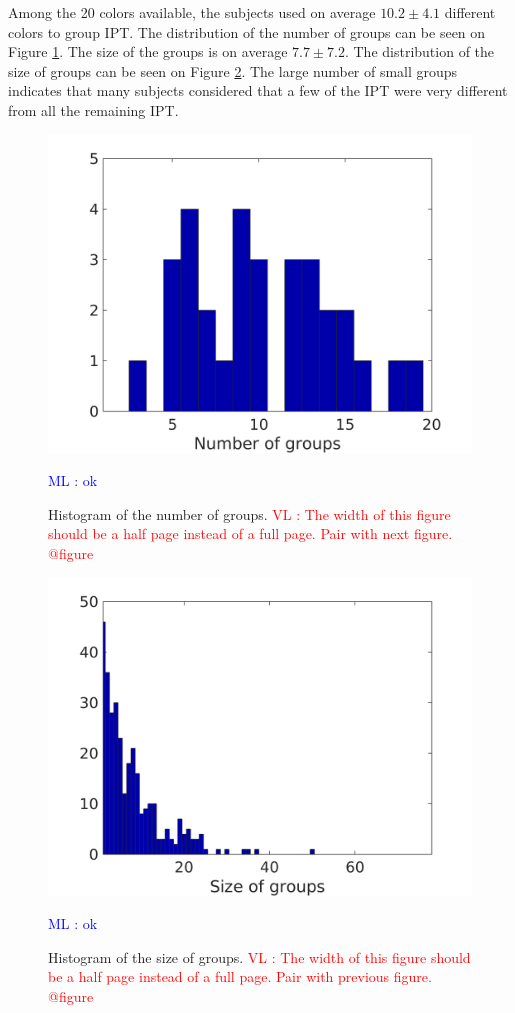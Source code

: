 \documentclass{article}
\newcommand{\ipt}{IPT\xspace}
\newcommand{\ml}[1]{\textcolor{blue}{ML : #1}}
\newcommand{\vl}[1]{\textcolor{red}{VL : #1}}
\begin{document}
Among the 20 colors available, the subjects used on average $10.2 \pm  4.1$ different colors to group \ipt. The distribution of the number of groups can be seen on Figure \ref{fig:xp2nbGroup}. The size of the groups is on average $7.7 \pm   7.2$. The distribution of the size of groups can be seen on Figure \ref{fig:xp2sizeGroup}. The large number of small groups indicates that many subjects considered that a few of the \ipt were very different from all the remaining \ipt.

\begin{figure}
\center
\includegraphics[width = \textwidth]{figures/nbc.png}
\caption{Histogram of the number of groups.
\vl{The width of this figure should be a half page instead of a full page. Pair with next figure. @figure}}
\ml{ok}
\label{fig:xp2nbGroup}
\end{figure}

\begin{figure}
\center
\includegraphics[width = \textwidth]{figures/sbc.png}
\caption{Histogram of the size of groups.
\vl{The width of this figure should be a half page instead of a full page. Pair with previous figure. @figure}}
\ml{ok}
\label{fig:xp2sizeGroup}
\end{figure}
\end{document}
